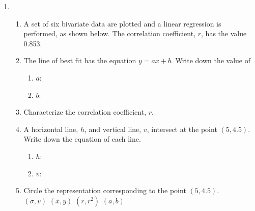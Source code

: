 \documentclass[12pt, twoside]{article}
\begin{document}
\begin{enumerate}
    \item \begin{enumerate}[itemsep=0.75cm]
    \item A set of six bivariate data are plotted and a linear regression is performed, as shown below. The correlation coefficient, $r$, has the value 0.853.
    \begin{center}
    \end{center}
    \item The line of best fit has the equation $y=ax+b$. Write down the value of 
      \begin{enumerate}[itemsep=0.75cm]
      \item $a$: 
      \item $b$:
      \end{enumerate}
    \item Characterize the correlation coefficient, $r$.
    \item A horizontal line, $h$, and vertical line, $v$, intersect at the point $(5,4.5)$. Write down the equation of each line.
    \begin{enumerate}[itemsep=0.75cm]
      \item $h$: 
      \item $v$:
      \end{enumerate}
    \item Circle the representation corresponding to the point $(5,4.5)$.\\[0.5cm]
    $(\sigma, v)$ \hfill $(\overline{x},\overline{y})$ \hfill $(r, r^2)$ \hfill $(a, b)$ \hspace{1cm}
    \end{enumerate}
    
\end{enumerate}
\end{document}
